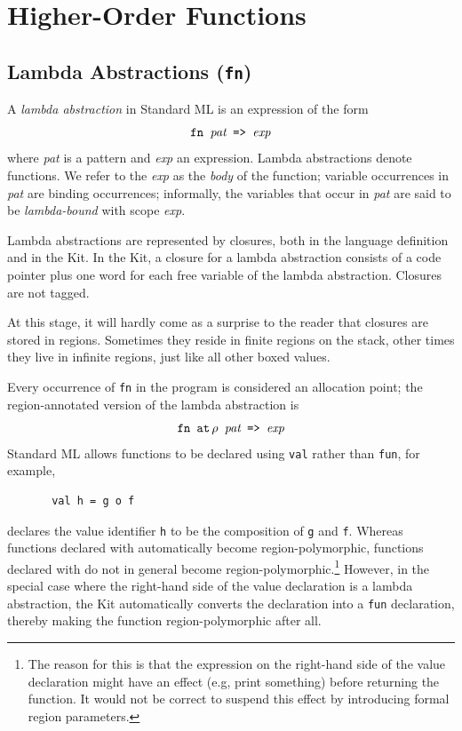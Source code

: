 \documentclass[12pt]{book}
\begin{document}
\chapter{Higher-Order Functions}
\label{hof.sec}
%
\section{Lambda Abstractions ({\tt fn})}
A {\em lambda abstraction} 
%
in Standard ML is an expression of the
form 
$$\hbox{\tt fn {\it pat} => {\it exp}}$$
where {\it pat} is a pattern and {\it exp} an expression.
Lambda abstractions denote functions. We refer to the {\it exp} as the
{\em body} of the function; variable occurrences in {\it pat} are
binding occurrences; informally, the variables that occur
in {\it pat} are said to be {\em lambda-bound} with scope 
{\it exp}. 

Lambda abstractions are represented by closures, both in the language
definition and in the Kit. In the Kit, a closure for a lambda abstraction
consists of a code pointer plus one word for each free variable of the
lambda abstraction. Closures are not tagged. 

At this stage, it will hardly come as a surprise to the reader that closures are stored
in regions.  Sometimes they reside in finite regions on the stack, other times
they live in infinite regions, just like all other boxed values.

Every occurrence of {\tt fn} in the program is considered 
an allocation point; the region-annotated version of the lambda abstraction is
$$\hbox{\tt fn $\mathbin{\hbox{\tt at}}\,\rho$ {\it pat} => {\it exp}}$$
Standard ML allows  functions to be declared using {\tt val} rather than {\tt fun}, for example, 
\begin{verbatim}
       val h = g o f
\end{verbatim}
declares the value identifier {\tt h} to be the composition of {\tt g}
and {\tt f}.  Whereas functions declared with  automatically become region-polymorphic, functions
declared with  do not in general become
%
region-polymorphic.\footnote{The reason for this is that the
  expression on the right-hand side of the value declaration might
  have an effect (e.g, print something) before returning the function.
  It would not be correct to suspend this effect by introducing formal
  region parameters.} However, in the special case where the
right-hand side of the value declaration is a
%
lambda abstraction, the Kit automatically converts the declaration
into a {\tt fun} declaration, thereby making the function
region-polymorphic after all.
\end{document}
